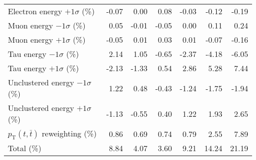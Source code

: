 \begin{table}[htbp]
{\begin{tabular}{lrrrrrr}
Electron energy $+1\sigma$ (\%) & -0.07 & 0.00 & 0.08 & -0.03 & -0.12 & -0.19 \\ 
Muon energy $-1\sigma$ (\%) & 0.05 & -0.01 & -0.05 & 0.00 & 0.11 & 0.24 \\ 
Muon energy $+1\sigma$ (\%) & -0.05 & 0.01 & 0.03 & 0.01 & -0.07 & -0.16 \\ 
Tau energy $-1\sigma$ (\%) & 2.14 & 1.05 & -0.65 & -2.37 & -4.18 & -6.05 \\ 
Tau energy $+1\sigma$ (\%) & -2.13 & -1.33 & 0.54 & 2.86 & 5.28 & 7.44 \\ 
Unclustered energy $-1\sigma$ (\%) & 1.22 & 0.48 & -0.43 & -1.24 & -1.75 & -1.94 \\ 
Unclustered energy $+1\sigma$ (\%) & -1.13 & -0.55 & 0.40 & 1.22 & 1.93 & 2.65 \\ 
$p_\mathrm{T}(t,\bar{t})$ reweighting (\%) & 0.86 & 0.69 & 0.74 & 0.79 & 2.55 & 7.89 \\ 
\hline 
Total (\%) & 8.84  & 4.07  & 3.60  & 9.21  & 14.24  & 21.19 \\ 
\hline 
\end{tabular}
}
\end{table}
